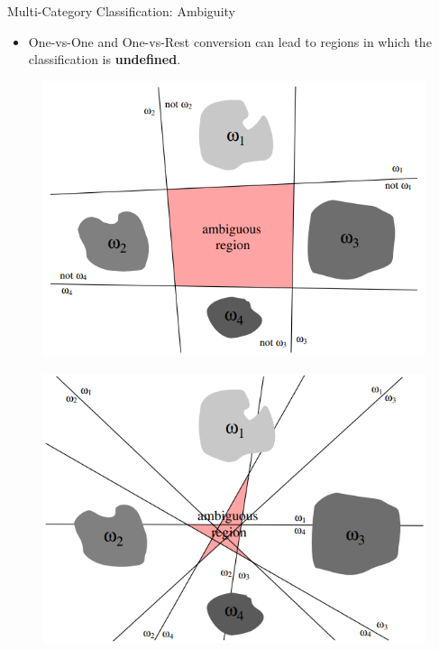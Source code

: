 \documentclass[serif, aspectratio=169]{beamer}
\begin{document}
\begin{frame}{Multi-Category Classification: Ambiguity}
    \begin{itemize}
        \item \justifying One-vs-One and One-vs-Rest conversion can lead to regions in which the classification is \textbf{undefined}.
    \end{itemize}
    \vfill
    \begin{figure}[bh]
        \centering
        \includegraphics[width=\linewidth]{pic/Figure_6.png}
    \end{figure}
    \endminipage
    \begin{figure}[bh]
        \centering
        \includegraphics[width=\linewidth]{pic/Figure_7.png}
    \end{figure}
    \endminipage
\end{frame}
\end{document}
